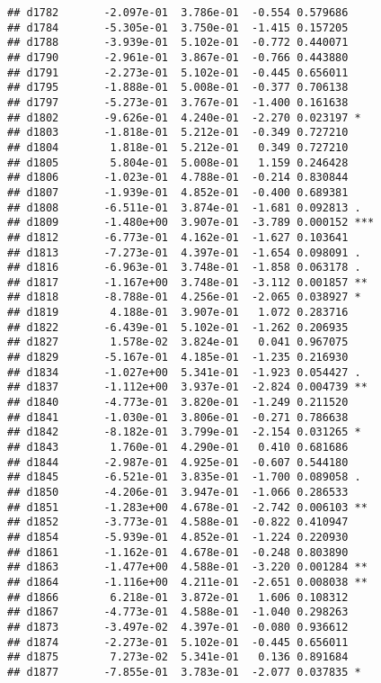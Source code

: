 \documentclass[
]{article}
\begin{document}
\begin{verbatim}
## d1782       -2.097e-01  3.786e-01  -0.554 0.579686    
## d1784       -5.305e-01  3.750e-01  -1.415 0.157205    
## d1788       -3.939e-01  5.102e-01  -0.772 0.440071    
## d1790       -2.961e-01  3.867e-01  -0.766 0.443880    
## d1791       -2.273e-01  5.102e-01  -0.445 0.656011    
## d1795       -1.888e-01  5.008e-01  -0.377 0.706138    
## d1797       -5.273e-01  3.767e-01  -1.400 0.161638    
## d1802       -9.626e-01  4.240e-01  -2.270 0.023197 *  
## d1803       -1.818e-01  5.212e-01  -0.349 0.727210    
## d1804        1.818e-01  5.212e-01   0.349 0.727210    
## d1805        5.804e-01  5.008e-01   1.159 0.246428    
## d1806       -1.023e-01  4.788e-01  -0.214 0.830844    
## d1807       -1.939e-01  4.852e-01  -0.400 0.689381    
## d1808       -6.511e-01  3.874e-01  -1.681 0.092813 .  
## d1809       -1.480e+00  3.907e-01  -3.789 0.000152 ***
## d1812       -6.773e-01  4.162e-01  -1.627 0.103641    
## d1813       -7.273e-01  4.397e-01  -1.654 0.098091 .  
## d1816       -6.963e-01  3.748e-01  -1.858 0.063178 .  
## d1817       -1.167e+00  3.748e-01  -3.112 0.001857 ** 
## d1818       -8.788e-01  4.256e-01  -2.065 0.038927 *  
## d1819        4.188e-01  3.907e-01   1.072 0.283716    
## d1822       -6.439e-01  5.102e-01  -1.262 0.206935    
## d1827        1.578e-02  3.824e-01   0.041 0.967075    
## d1829       -5.167e-01  4.185e-01  -1.235 0.216930    
## d1834       -1.027e+00  5.341e-01  -1.923 0.054427 .  
## d1837       -1.112e+00  3.937e-01  -2.824 0.004739 ** 
## d1840       -4.773e-01  3.820e-01  -1.249 0.211520    
## d1841       -1.030e-01  3.806e-01  -0.271 0.786638    
## d1842       -8.182e-01  3.799e-01  -2.154 0.031265 *  
## d1843        1.760e-01  4.290e-01   0.410 0.681686    
## d1844       -2.987e-01  4.925e-01  -0.607 0.544180    
## d1845       -6.521e-01  3.835e-01  -1.700 0.089058 .  
## d1850       -4.206e-01  3.947e-01  -1.066 0.286533    
## d1851       -1.283e+00  4.678e-01  -2.742 0.006103 ** 
## d1852       -3.773e-01  4.588e-01  -0.822 0.410947    
## d1854       -5.939e-01  4.852e-01  -1.224 0.220930    
## d1861       -1.162e-01  4.678e-01  -0.248 0.803890    
## d1863       -1.477e+00  4.588e-01  -3.220 0.001284 ** 
## d1864       -1.116e+00  4.211e-01  -2.651 0.008038 ** 
## d1866        6.218e-01  3.872e-01   1.606 0.108312    
## d1867       -4.773e-01  4.588e-01  -1.040 0.298263    
## d1873       -3.497e-02  4.397e-01  -0.080 0.936612    
## d1874       -2.273e-01  5.102e-01  -0.445 0.656011    
## d1875        7.273e-02  5.341e-01   0.136 0.891684    
## d1877       -7.855e-01  3.783e-01  -2.077 0.037835 *  

\end{verbatim}
\end{document}

